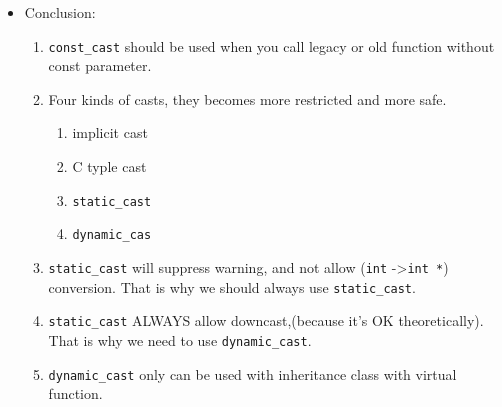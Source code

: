 \documentclass[a4paper,11pt,twoside]{book}
\begin{document}
\begin{itemize}
	\item Conclusion:
\begin{enumerate}
	\item \texttt{const\_cast} should be used when you call legacy or old function without const parameter. 
	
	\item Four kinds of casts, they becomes more restricted and more safe. 
	\begin{enumerate}
		\item implicit cast
		\item C typle cast
		\item \texttt{static\_cast}
		\item \texttt{dynamic\_cas}
	\end{enumerate}
	
	
	\item \texttt{static\_cast} will suppress warning, and not allow (\texttt{int} ->\texttt{int *}) conversion. That is why we should always use \texttt{static\_cast}. 
	
	\item \texttt{static\_cast} ALWAYS allow downcast,(because it's OK theoretically). That is why we need to use \texttt{dynamic\_cast}.
	
	\item \texttt{dynamic\_cast} only can be used with inheritance class with virtual function. 
\end{enumerate}
	
\end{itemize}
\end{document}
